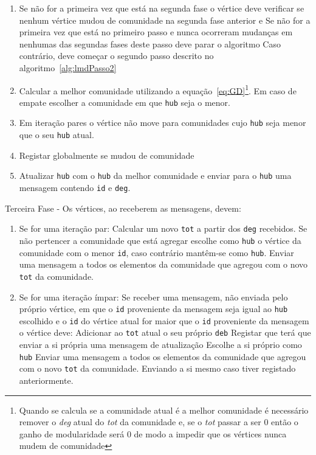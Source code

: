 \begin{enumerate}
\begin{algorithm}
\begin{minipage}{\textwidth}
		\begin{enumerate}
				\item Se não for a primeira vez que está na segunda fase o vértice deve verificar se nenhum vértice mudou de comunidade na segunda fase anterior e
						\subitem Se não for a primeira vez que está no primeiro passo e nunca ocorreram mudanças em nenhumas das segundas fases deste passo deve parar o algoritmo
						\subitem Caso contrário, deve começar o segundo passo descrito no algoritmo~\ref{alg:lmdPasso2}
				\item Calcular a melhor comunidade utilizando a equação~\ref{eq:GD}\footnote{Quando se calcula se a comunidade atual é a melhor comunidade é necessário remover o \textit{deg} atual do \textit{tot} da comunidade e, se o \textit{tot} passar a ser 0 então o ganho de modularidade será 0 de modo a impedir que os vértices nunca mudem de comunidade}. 
				Em caso de empate	escolher a comunidade em que \verb|hub| seja o menor.
				\label{prt:force}
				\item Em iteração pares o vértice não move para comunidades cujo \verb|hub| seja menor que o seu \verb|hub| atual.
				\item Registar globalmente se mudou de comunidade
				\item Atualizar \verb|hub| com o \verb|hub| da melhor comunidade e enviar para o \verb|hub| uma mensagem contendo \verb|id| e \verb|deg|.
		\end{enumerate}
			\end{minipage}
\end{algorithm}
\begin{algorithm}
  \item Terceira Fase - Os vértices, ao receberem as mensagens, devem:
\begin{enumerate}
		\item Se for uma iteração par:
				\subitem Calcular um novo \verb|tot| a partir dos \verb|deg| recebidos.
				\label{prt:cycle2}
				\subitem Se não pertencer a comunidade que está agregar escolhe como \verb|hub| o vértice da comunidade com o menor \verb|id|, caso contrário mantêm-se como \verb|hub|.
				\subitem Enviar uma mensagem a todos os elementos da comunidade que agregou com o novo \verb|tot| da comunidade.
		\item Se for uma iteração ímpar:
		\label{prt:cycle1}
		\subitem Se receber uma mensagem, não enviada pelo próprio vértice, em que o \verb|id| proveniente da mensagem seja igual ao \verb|hub| escolhido e o \verb|id| do vértice atual for maior que o \verb|id| proveniente da mensagem o vértice deve:
				\subsubitem Adicionar ao \verb|tot| atual o seu próprio \verb|deb|
				\subsubitem Registar que terá que enviar a si própria uma mensagem de atualização
				\subsubitem Escolhe a si próprio como \verb|hub|
		\subitem Enviar uma mensagem a todos os elementos da comunidade que agregou com o novo \verb|tot| da comunidade. Enviando a si mesmo caso tiver registado anteriormente.
\end{enumerate}
\end{algorithm}
\end{enumerate}



